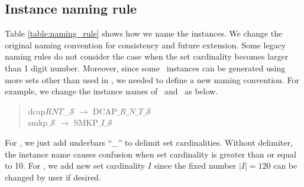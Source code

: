 \subsection{Instance naming rule}
Table \ref{table:naming_rule} shows how we name the instances. We change the original naming convention for consistency and future extension. Some legacy naming rules do not consider the case when the set cardinality becomes larger than 1 digit number. Moreover, since some \siplibtwo\ instances can be generated using more sets other than used in \siplib, we needed to define a new naming convention. For example, we change the instance names of \dcap\ and \smkp\ as below.
\begin{quote}
	\centering dcap$RNT$\_$\mathcal{S}$ $\longrightarrow$ DCAP$\_R\_N\_T\_\mathcal{S}$\\
	smkp$\_\mathcal{S}$ $\longrightarrow$ SMKP$\_I\_\mathcal{S}$
\end{quote}
For \dcap, we just add underbars ``\_'' to delimit set cardinalities. Without delimiter, the instance name causes confusion when set cardinality is greater than or equal to 10. For \smkp, we add new set cardinality $I$ since the fixed number $|I|=120$ can be changed by user if desired.

